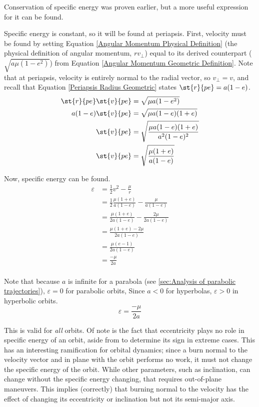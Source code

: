 \documentclass[../basicOrbitalDynamics.tex]{subfiles}
\begin{document}
Conservation of specific energy was proven earlier, but a more useful expression for it can be found.

Specific energy is constant, so it will be found at periapsis. First, velocity must be found by setting Equation \eqref{Angular Momentum Physical Definition} (the physical definition of angular momentum, $rv_\perp$) equal to its derived counterpart ($\sqrt{a\mu(1-e^2)}$) from Equation \eqref{Angular Momentum Geometric Definition}. Note that at periapsis, velocity is entirely normal to the radial vector, so $v_\perp=v$, and recall that Equation \eqref{Periapsis Radius Geometric} states $\st{r}{pe}=a(1-e)$.
\begin{align*}
    \st{r}{pe}\st{v}{pe} & = \sqrt{\mu{}a(1-e^2)}                       \\
    a(1-e)\st{v}{pe}      & = \sqrt{\mu{}a(1-e)(1+e)}                    \\
    \st{v}{pe}            & = \sqrt{\frac{\mu{}a(1-e)(1+e)}{a^2(1-e)^2}} \\
    \st{v}{pe}            & = \sqrt{\frac{\mu{}(1+e)}{a(1-e)}}           \\
\end{align*}

Now, specific energy can be found.
\begin{align*}
    \varepsilon & = \frac{1}{2}v^2-\frac{\mu}{r}                            \\
                & = \frac{1}{2}\frac{\mu{}(1+e)}{a(1-e)}-\frac{\mu}{a(1-e)} \\
                & = \frac{\mu{}(1+e)}{2a(1-e)}-\frac{2\mu}{2a(1-e)}         \\
                & = \frac{\mu{}(1+e)-2\mu}{2a(1-e)}                         \\
                & = \frac{\mu{}(e-1)}{2a(1-e)}                              \\
                & = \frac{-\mu}{2a}                                         \\
\end{align*}

Note that because $a$ is infinite for a parabola (see \ref{sec:Analysis of parabolic trajectories}), $\varepsilon=0$ for parabolic orbits, Since $a<0$ for hyperbolas, $\varepsilon>0$ in hyperbolic orbits.
\begin{equation}\label{Specific Energy Geometric}
    \varepsilon=\frac{-\mu}{2a}
\end{equation}

This is valid for \textit{all} orbits. Of note is the fact that eccentricity plays no role in specific energy of an orbit, aside from to determine its sign in extreme cases. This has an interesting ramification for orbital dynamics; since a burn normal to the velocity vector and in plane with the orbit performs no work, it must not change the specific energy of the orbit. While other parameters, such as inclination, can change without the specific energy changing, that requires out-of-plane maneuvers. This implies (correctly) that burning normal to the velocity has the effect of changing its eccentricity or inclination but not its semi-major axis.
\end{document}
